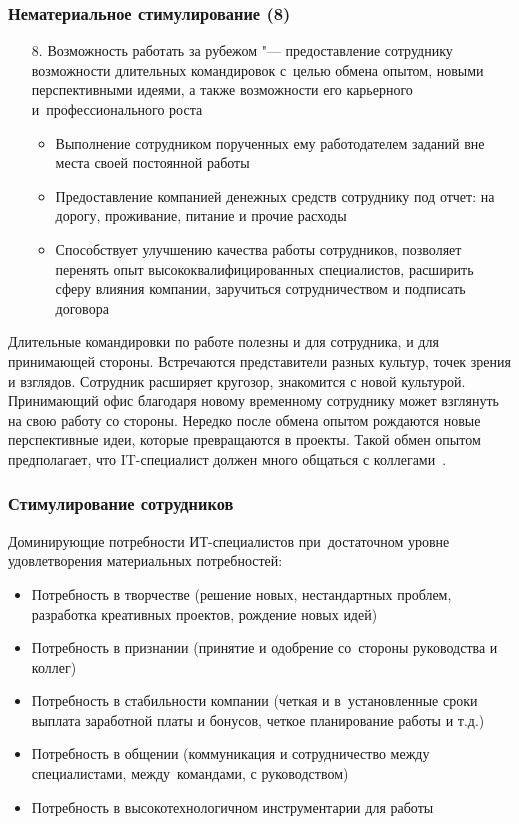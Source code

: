 \documentclass{../industrial-development}
\begin{document}
\begin{frame} \frametitle{Нематериальное стимулирование (8)}
	\begin{itemize}
		\item[8.] \alert{Возможность работать за рубежом} "--- предоставление сотруднику возможности длительных командировок с~целью обмена опытом, новыми перспективными идеями, а также возможности его карьерного и~профессионального роста				
		\begin{itemize}
			\item Выполнение сотрудником порученных ему работодателем заданий вне места своей постоянной работы 
			\item Предоставление компанией денежных средств сотруднику под отчет: на дорогу, проживание, питание и прочие расходы
			\item Способствует улучшению качества работы сотрудников, позволяет перенять опыт высококвалифицированных специалистов, расширить сферу влияния компании, заручиться сотрудничеством и подписать договора
		\end{itemize}
	\end{itemize}
\end{frame}

\lecturenotes

Длительные командировки по работе полезны и для сотрудника, и для принимающей стороны. Встречаются представители разных культур, точек зрения и взглядов. Сотрудник расширяет кругозор, знакомится с новой культурой. Принимающий офис благодаря новому временному сотруднику может взглянуть на свою работу со стороны. Нередко после обмена опытом рождаются новые перспективные идеи, которые превращаются в проекты. Такой обмен опытом предполагает, что IT-специалист должен много общаться с коллегами~\cite{VchemosobenIT}.

\begin{frame} \frametitle{Стимулирование сотрудников}
	Доминирующие потребности ИТ-специалистов при~достаточном уровне удовлетворения материальных потребностей:
	\begin{itemize}				
		\item Потребность в творчестве (решение новых, нестандартных проблем, разработка креативных проектов, рождение новых идей)
		\item Потребность в признании (принятие и одобрение со~стороны руководства и коллег)
		\item Потребность в стабильности компании (четкая и в~установленные сроки выплата заработной платы и бонусов, четкое планирование работы и т.д.)
		\item Потребность в общении (коммуникация и
		сотрудничество между специалистами, между~командами, с руководством)
		\item Потребность в высокотехнологичном инструментарии для работы
	\end{itemize}
\end{frame}
\end{document}
